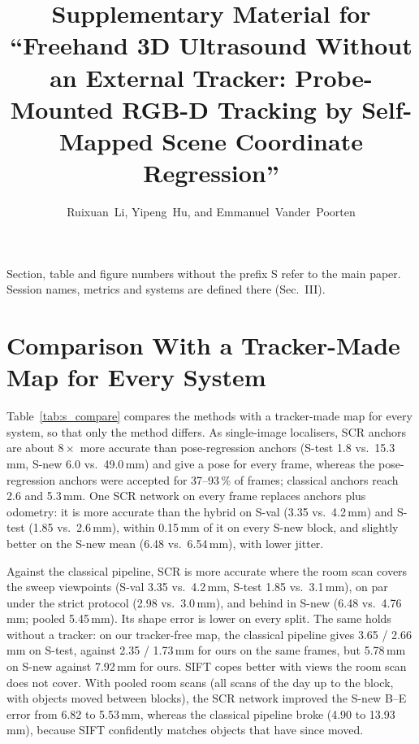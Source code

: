 \documentclass[journal]{IEEEtran}
\newcommand{\Sval}{S-val}
\newcommand{\Stest}{S-test}
\newcommand{\Snew}{S-new}
\begin{document}
\title{Supplementary Material for ``Freehand 3D Ultrasound Without an External Tracker: Probe-Mounted RGB-D Tracking by Self-Mapped Scene Coordinate Regression''}
\author{Ruixuan~Li, Yipeng~Hu, and Emmanuel~Vander~Poorten}
\maketitle

Section, table and figure numbers without the prefix S refer to the main paper. Session names, metrics and systems are defined there (Sec.~III).

\section{Comparison With a Tracker-Made Map for Every System}
\label{sec:s_compare}
Table~\ref{tab:s_compare} compares the methods with a tracker-made map for every system, so that only the method differs. As single-image localisers, SCR anchors are about $8\times$ more accurate than pose-regression anchors (\Stest{} 1.8 vs.\ 15.3\,mm, \Snew{} 6.0 vs.\ 49.0\,mm) and give a pose for every frame, whereas the pose-regression anchors were accepted for 37--93\,\% of frames; classical anchors reach 2.6 and 5.3\,mm. One SCR network on every frame replaces anchors plus odometry: it is more accurate than the hybrid on \Sval{} (3.35 vs.\ 4.2\,mm) and \Stest{} (1.85 vs.\ 2.6\,mm), within 0.15\,mm of it on every \Snew{} block, and slightly better on the \Snew{} mean (6.48 vs.\ 6.54\,mm), with lower jitter.

Against the classical pipeline, SCR is more accurate where the room scan covers the sweep viewpoints (\Sval{} 3.35 vs.\ 4.2\,mm, \Stest{} 1.85 vs.\ 3.1\,mm), on par under the strict protocol (2.98 vs.\ 3.0\,mm), and behind in \Snew{} (6.48 vs.\ 4.76\,mm; pooled 5.45\,mm). Its shape error is lower on every split. The same holds without a tracker: on our tracker-free map, the classical pipeline gives 3.65 / 2.66\,mm on \Stest{}, against 2.35 / 1.73\,mm for ours on the same frames, but 5.78\,mm on \Snew{} against 7.92\,mm for ours. SIFT copes better with views the room scan does not cover. With pooled room scans (all scans of the day up to the block, with objects moved between blocks), the SCR network improved the \Snew{} B--E error from 6.82 to 5.53\,mm, whereas the classical pipeline broke (4.90 to 13.93\,mm), because SIFT confidently matches objects that have since moved.
\end{document}
